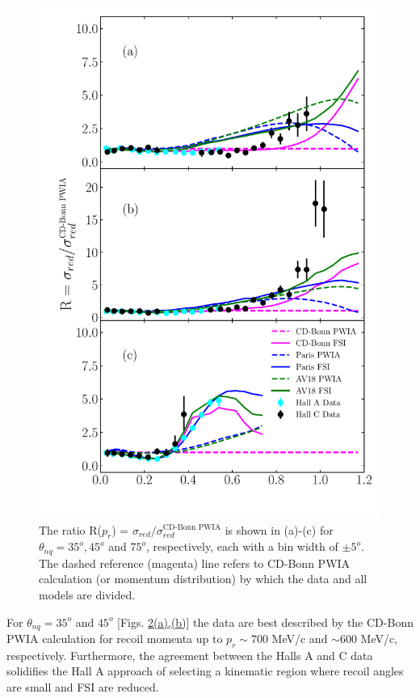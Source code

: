 \begin{figure}[h!]
\includegraphics[scale=0.5]{./prl_plots/PRL_plot2.pdf}
\caption{The ratio R($p_{r}$) = $\sigma_{red}/\sigma^{{\text{CD-Bonn PWIA}}}_{red}$ is shown in (a)-(c) for $\theta_{nq}=35^{o}, 45^{o}$ and $75^{o}$, respectively, each with a bin width of $\pm 5^{o}$.
The dashed reference (magenta) line refers to CD-Bonn PWIA calculation (or momentum distribution) by which the data and all models are divided.}
\label{fig:fig2}
\end{figure}
\indent For $\theta_{nq}=35^{o}$ and $45^{o}$ [Figs. \hyperref[fig:fig2]{2(a),(b)}] the data are best described by the CD-Bonn PWIA calculation for recoil momenta up to $p_{r}\sim700$ MeV/c and $\sim600$ MeV/c, respectively.
Furthermore, the agreement between the Halls A and C data solidifies the Hall A approach of selecting a kinematic region where recoil angles are small and FSI are reduced.
